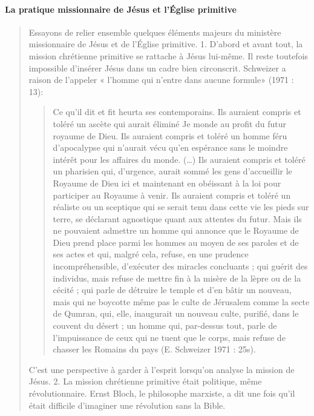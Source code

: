 \paragraph{La pratique missionnaire de Jésus et l'Église primitive}
\begin{quote}

Essayons de relier ensemble quelques éléments majeurs du
ministère missionnaire de Jésus et de l'Église primitive.
1. D'abord et avant tout, la mission chrétienne primitive se rattache
à Jésus lui-même. Il reste toutefois impossible d'insérer Jésus dans un
cadre bien circonscrit. Schweizer a raison de l'appeler « l'homme qui
n'entre dans aucune formule» (1971 : 13):
\begin{quote}
    Ce qu'il dit et fit heurta ses contemporains. Ils auraient compris et toléré
un ascète qui aurait éliminé Je monde au profit du futur royaume de Dieu.
Ils auraient compris et toléré un homme féru d'apocalypse qui n'aurait
vécu qu'en espérance sans le moindre intérêt pour les affaires du monde.
(\ldots) Ils auraient compris et toléré un pharisien qui, d'urgence, aurait
sommé les gens d'accueillir le Royaume de Dieu ici et maintenant en
obéissant à la loi pour participer au Royaume à venir. Ils auraient compris
et toléré un réaliste ou un sceptique qui se serait tenu dans cette vie les
pieds sur terre, se déclarant agnostique quant aux attentes du futur. Mais ils
ne pouvaient admettre un homme qui annonce que le Royaume de Dieu
prend place parmi les hommes au moyen de ses paroles et de ses actes et
qui, malgré cela, refuse, en une prudence incompréhensible, d'exécuter des
miracles concluants ; qui guérit des individus, mais refuse de mettre fin à
la misère de la lèpre ou de la cécité ; qui parle de détruire le temple et d'en
bâtir un nouveau, mais qui ne boycotte même pas le culte de Jérusalem
comme la secte de Qumran, qui, elle, inaugurait un nouveau culte, purifié,
dans le couvent du désert ; un homme qui, par-dessus tout, parle de
l'impuissance de ceux qui ne tuent que le corps, mais refuse de chasser les
Romains du pays (E. Schweizer 1971 : 25s).
\end{quote}

C'est une perspective à garder à l'esprit lorsqu'on analyse la mission
de Jésus.
2. La mission chrétienne primitive était politique, même
révolutionnaire. Ernst Bloch, le philosophe marxiste, a dit une fois
qu'il était difficile d'imaginer une révolution sans la Bible. 
\end{quote}

